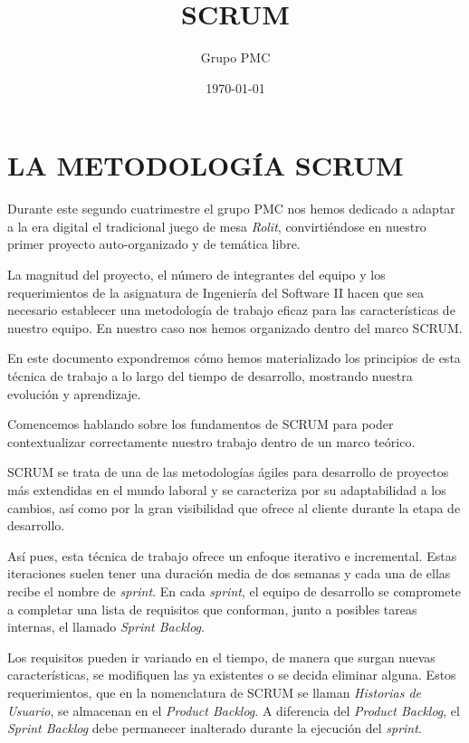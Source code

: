 \documentclass[../DocumentoOficial.tex]{subfiles}
\title{\Huge SCRUM}
\date{\today}
\author{Grupo PMC}
\begin{document}
\maketitle
\setcounter{tocdepth}{3}
\setcounter{secnumdepth}{3}
\tableofcontents

\chapter{LA METODOLOGÍA SCRUM}\label{scrum_mth}
Durante este segundo cuatrimestre el grupo PMC nos hemos dedicado a adaptar a la era digital el tradicional juego de mesa \textit{Rolit}, convirtiéndose en nuestro primer proyecto auto-organizado y de temática libre.

La magnitud del proyecto, el número de integrantes del equipo y los requerimientos de la asignatura de Ingeniería del Software II hacen que sea necesario establecer una metodología de trabajo eficaz para las características de nuestro equipo. En nuestro caso nos hemos organizado dentro del marco SCRUM.

En este documento expondremos cómo hemos materializado los principios de esta técnica de trabajo a lo largo del tiempo de desarrollo, mostrando nuestra evolución y aprendizaje.

Comencemos hablando sobre los fundamentos de SCRUM para poder contextualizar correctamente nuestro trabajo dentro de un marco teórico.

SCRUM se trata de una de las metodologías ágiles para desarrollo de proyectos más extendidas en el mundo laboral y se caracteriza por su adaptabilidad a los cambios, así como por la gran visibilidad que ofrece al cliente durante la etapa de desarrollo.

Así pues, esta técnica de trabajo ofrece un enfoque iterativo e incremental. Estas iteraciones suelen tener una duración media de dos semanas y cada una de ellas recibe el nombre de \textit{sprint}. En cada \textit{sprint}, el equipo de desarrollo se compromete a completar una lista de requisitos que conforman, junto a posibles tareas internas, el llamado \textit{Sprint Backlog}.

Los requisitos pueden ir variando en el tiempo, de manera que surgan nuevas características, se modifiquen las ya existentes o se decida eliminar alguna. Estos requerimientos, que en la nomenclatura de SCRUM se llaman \textit{Historias de Usuario}, se almacenan en el \textit{Product Backlog}. A diferencia del \textit{Product Backlog}, el \textit{Sprint Backlog} debe permanecer inalterado durante la ejecución del \textit{sprint}.
\end{document}
